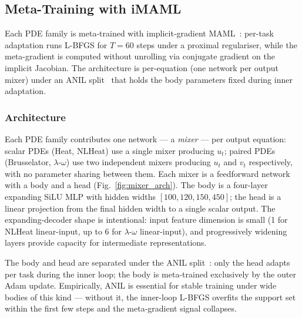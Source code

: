 \documentclass[10pt,journal,compsoc]{IEEEtran}
\begin{document}
\subsection{Meta-Training with iMAML}\label{subsec:meta_training_imaml}

Each PDE family is meta-trained with implicit-gradient
MAML~\cite{rajeswaran2019}: per-task adaptation runs L-BFGS for
$T = 60$ steps under a proximal regulariser, while the meta-gradient is
computed without unrolling via conjugate gradient on the implicit
Jacobian. The architecture is per-equation (one network per output mixer)
under an ANIL split~\cite{raghu2020} that holds the body parameters
fixed during inner adaptation.

\subsubsection{Architecture}\label{subsubsec:architecture}

Each PDE family contributes one network --- a \emph{mixer} --- per output
equation: scalar PDEs (Heat, NLHeat) use a single mixer producing $u_t$;
paired PDEs (Brusselator, $\lambda$-$\omega$) use two independent mixers
producing $u_t$ and $v_t$ respectively, with no parameter sharing between
them. Each mixer is a feedforward network with a body and a head
(Fig.~\ref{fig:mixer_arch}). The body is a four-layer expanding SiLU MLP
with hidden widths $[100, 120, 150, 450]$; the head is a linear projection
from the final hidden width to a single scalar output. The
expanding-decoder shape is intentional: input feature dimension is small
(1 for NLHeat linear-input, up to 6 for $\lambda$-$\omega$ linear-input), and
progressively widening layers provide capacity for intermediate
representations.

The body and head are separated under the ANIL
split~\cite{raghu2020}: only the head adapts per task during the
inner loop; the body is meta-trained exclusively by the outer Adam
update. Empirically, ANIL is essential for stable training under wide
bodies of this kind --- without it, the inner-loop L-BFGS overfits the
support set within the first few steps and the meta-gradient signal
collapses.
\end{document}
